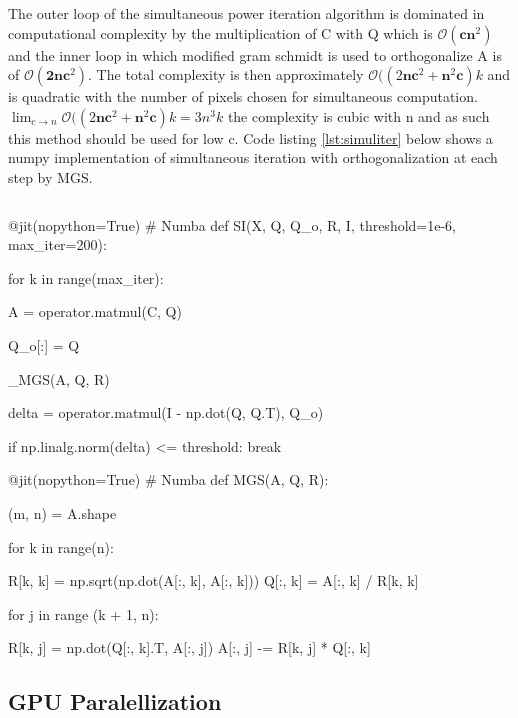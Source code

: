 \documentclass[12pt]{article}
\begin{document}
The outer loop of the simultaneous power iteration algorithm is dominated in computational complexity by the multiplication of C with Q which is $\mathcal{O}(\textbf{cn}^2)$ and the inner loop in which modified gram schmidt is used to orthogonalize A is of $\mathcal{O}(\textbf{2nc}^2)$. The total complexity is then approximately $\mathcal{O}((2\textbf{nc}^2+\textbf{n}^2\textbf{c})k$ and is quadratic with the number of pixels chosen for simultaneous computation. $\lim_{c \to n} \mathcal{O}((2\textbf{nc}^2+\textbf{n}^2\textbf{c})k=3n^3k$ the complexity is cubic with n and as such this method should be used for low c. Code listing \ref{lst:simuliter} below shows a numpy implementation of simultaneous iteration with orthogonalization at each step by MGS.
\pagebreak
\begin{lstlisting}[frame=none,caption={Calculating Principal Components with Eigenvalue Decomposition via Simultaneous Power Iteration},captionpos=b,label=lst:simuliter]
\end{lstlisting}
\begin{python}
@jit(nopython=True) # Numba
def SI(X, Q, Q_o, R, I, threshold=1e-6, max_iter=200):

    for k in range(max_iter):

        A = operator.matmul(C, Q)

        Q_o[:] = Q

        _MGS(A, Q, R)

        delta = operator.matmul(I - np.dot(Q, Q.T), Q_o)

        if np.linalg.norm(delta) <= threshold:
            break

@jit(nopython=True) # Numba
def MGS(A, Q, R):

    (m, n) = A.shape

    for k in range(n):

        R[k, k] = np.sqrt(np.dot(A[:, k], A[:, k]))
        Q[:, k] = A[:, k] / R[k, k]

        for j in range (k + 1, n):

            R[k, j] = np.dot(Q[:, k].T, A[:, j])
            A[:, j] -= R[k, j] * Q[:, k]
\end{python}

\subsection{GPU Paralellization}\label{3.4}
\end{document}
